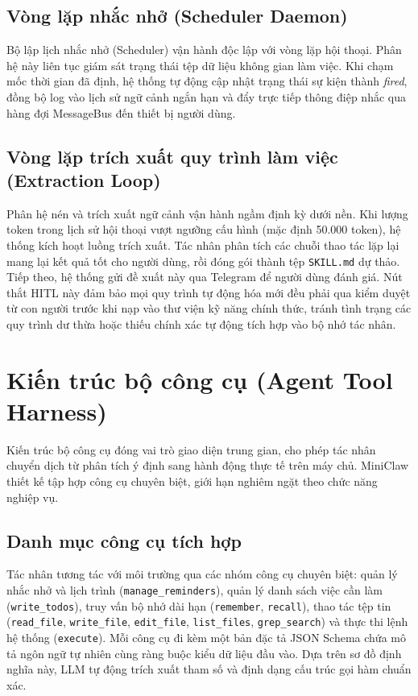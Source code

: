 \subsection{Vòng lặp nhắc nhở (Scheduler Daemon)}
Bộ lập lịch nhắc nhở (Scheduler) vận hành độc lập với vòng lặp hội thoại. Phân hệ này liên tục giám sát trạng thái tệp dữ liệu không gian làm việc. Khi chạm mốc thời gian đã định, hệ thống tự động cập nhật trạng thái sự kiện thành \emph{fired}, đồng bộ log vào lịch sử ngữ cảnh ngắn hạn và đẩy trực tiếp thông điệp nhắc qua hàng đợi MessageBus đến thiết bị người dùng.

\subsection{Vòng lặp trích xuất quy trình làm việc (Extraction Loop)}
Phân hệ nén và trích xuất ngữ cảnh vận hành ngầm định kỳ dưới nền. Khi lượng token trong lịch sử hội thoại vượt ngưỡng cấu hình (mặc định 50.000 token), hệ thống kích hoạt luồng trích xuất. Tác nhân phân tích các chuỗi thao tác lặp lại mang lại kết quả tốt cho người dùng, rồi đóng gói thành tệp \texttt{SKILL.md} dự thảo. Tiếp theo, hệ thống gửi đề xuất này qua Telegram để người dùng đánh giá. Nút thắt HITL này đảm bảo mọi quy trình tự động hóa mới đều phải qua kiểm duyệt từ con người trước khi nạp vào thư viện kỹ năng chính thức, tránh tình trạng các quy trình dư thừa hoặc thiếu chính xác tự động tích hợp vào bộ nhớ tác nhân.

\section{Kiến trúc bộ công cụ (Agent Tool Harness)}
\label{sec:agent-tool-system}
Kiến trúc bộ công cụ đóng vai trò giao diện trung gian, cho phép tác nhân chuyển dịch từ phân tích ý định sang hành động thực tế trên máy chủ. MiniClaw thiết kế tập hợp công cụ chuyên biệt, giới hạn nghiêm ngặt theo chức năng nghiệp vụ.

\subsection{Danh mục công cụ tích hợp}
Tác nhân tương tác với môi trường qua các nhóm công cụ chuyên biệt: quản lý nhắc nhở và lịch trình (\texttt{manage\_\allowbreak{}reminders}), quản lý danh sách việc cần làm (\texttt{write\_\allowbreak{}todos}), truy vấn bộ nhớ dài hạn (\texttt{remember}, \texttt{recall}), thao tác tệp tin (\texttt{read\_\allowbreak{}file}, \texttt{write\_\allowbreak{}file}, \texttt{edit\_\allowbreak{}file}, \texttt{list\_\allowbreak{}files}, \texttt{grep\_\allowbreak{}search}) và thực thi lệnh hệ thống (\texttt{execute}). Mỗi công cụ đi kèm một bản đặc tả JSON Schema chứa mô tả ngôn ngữ tự nhiên cùng ràng buộc kiểu dữ liệu đầu vào. Dựa trên sơ đồ định nghĩa này, LLM tự động trích xuất tham số và định dạng cấu trúc gọi hàm chuẩn xác.

